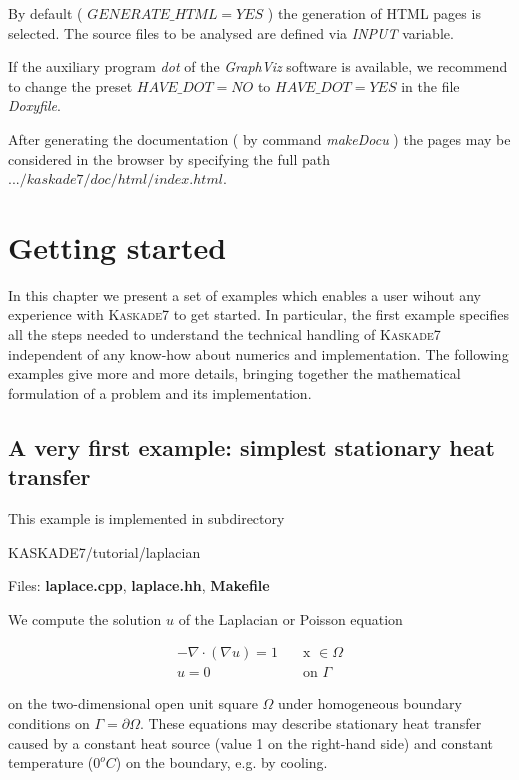 \documentclass[11pt]{article}
\newcommand{\K}{\textsc{Kaskade7 }}
\begin{document}
By default ( $GENERATE\_HTML = YES$ ) the generation of HTML pages is selected. The source files to be analysed are
defined via {\em INPUT} variable.

If the auxiliary program {\em dot} of the {\em GraphViz} software is available, we recommend to change the 
preset $HAVE\_DOT = NO$ to $HAVE\_DOT = YES$ in the file {\em Doxyfile}.


After generating the documentation ( by command {\em makeDocu} ) the pages may be considered
in the browser by specifying the full path $.../kaskade7/doc/html/index.html$.


\section{Getting started}\label{examples}
In this chapter we present a set of examples which enables a user wihout any experience
with \K to get started. In particular, the first example specifies all the steps needed to
understand the technical handling of \K independent of any know-how about numerics and implementation.
The following examples give more and more details, bringing together the mathematical
formulation of a problem and its implementation.



\subsection{A very first example: simplest stationary heat transfer}\label{Laplace}
This example is implemented in subdirectory 
\begin{center} KASKADE7/tutorial/laplacian\end{center}

\noindent Files: {\bf laplace.cpp}, {\bf laplace.hh}, {\bf Makefile}

\noindent We compute the solution $u$ of the Laplacian or Poisson equation

\begin{equation}\label{PDE_Laplace}
\begin{array}{rcl}
 -\nabla  \cdot (\nabla u) = 1 \quad &\mbox{x }\in  \Omega\\[2mm]
u = 0 \quad & \mbox{on } \Gamma
\end{array}
\end{equation}

\noindent on the two-dimensional open unit square $\Omega$ under homogeneous boundary conditions
on $\Gamma = \partial \Omega$. These equations may describe  stationary heat transfer caused by a
constant heat source (value 1 on the right-hand side) 
and constant temperature ($0 ^{o} C$) on the boundary, e.g. by cooling.
\end{document}

